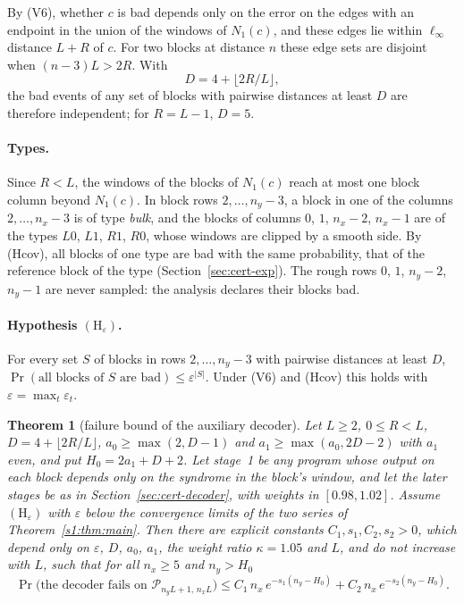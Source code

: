 \documentclass[11pt]{amsart}
\newtheorem{theorem}{Theorem}[section]
\theoremstyle{definition}
\theoremstyle{remark}
\numberwithin{equation}{section}
\begin{document}
By (V6), whether $c$ is bad depends only on the error on the edges with an endpoint in the union of the windows of $N_1(c)$, and these edges lie within $\ell_\infty$ distance $L+R$ of $c$. For two blocks at distance $n$ these edge sets are disjoint when $(n-3)L>2R$. With
\[
D=4+\lfloor 2R/L\rfloor ,
\]
the bad events of any set of blocks with pairwise distances at least $D$ are therefore independent; for $R=L-1$, $D=5$.

\paragraph{Types.} Since $R<L$, the windows of the blocks of $N_1(c)$ reach at most one block column beyond $N_1(c)$. In block rows $2,\dots,n_y-3$, a block in one of the columns $2,\dots,n_x-3$ is of type \emph{bulk}, and the blocks of columns $0$, $1$, $n_x-2$, $n_x-1$ are of the types $L0$, $L1$, $R1$, $R0$, whose windows are clipped by a smooth side. By (Hcov), all blocks of one type are bad with the same probability, that of the reference block of the type (Section~\ref{sec:cert-exp}). The rough rows $0$, $1$, $n_y-2$, $n_y-1$ are never sampled: the analysis declares their blocks bad.

\paragraph{Hypothesis $(\mathrm H_\varepsilon)$.} For every set $S$ of blocks in rows $2,\dots,n_y-3$ with pairwise distances at least $D$, $\Pr(\text{all blocks of }S\text{ are bad})\le\varepsilon^{|S|}$. Under (V6) and (Hcov) this holds with $\varepsilon=\max_t\varepsilon_t$.

\begin{theorem}[failure bound of the auxiliary decoder]\label{thm:cert}
Let $L\ge2$, $0\le R<L$, $D=4+\lfloor 2R/L\rfloor$, $a_0\ge\max(2,D-1)$ and $a_1\ge\max(a_0,2D-2)$ with $a_1$ even, and put $H_0=2a_1+D+2$. Let stage~1 be any program whose output on each block depends only on the syndrome in the block's window, and let the later stages be as in Section~\ref{sec:cert-decoder}, with weights in $[0.98,1.02]$. Assume $(\mathrm H_\varepsilon)$ with $\varepsilon$ below the convergence limits of the two series of Theorem~\ref{s1:thm:main}. Then there are explicit constants $C_1,s_1,C_2,s_2>0$, which depend only on $\varepsilon$, $D$, $a_0$, $a_1$, the weight ratio $\kappa=1.05$ and $L$, and do not increase with $L$, such that for all $n_x\ge5$ and $n_y>H_0$
\[
\Pr\bigl(\text{the decoder fails on }\mathcal P_{n_yL+1,\,n_xL}\bigr)\le C_1\,n_x\,e^{-s_1(n_y-H_0)}+C_2\,n_x\,e^{-s_2(n_y-H_0)} .
\]
\end{theorem}
\end{document}
